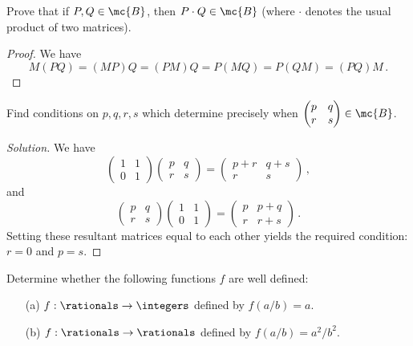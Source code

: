 \begin{exercise}
	Prove that if $P, Q \in \mc{B}$, then $P \cdot Q \in \mc{B}$ (where $\cdot$ denotes the usual product of two matrices).
\end{exercise}

\begin{proof}
	We have
	\[
		M(PQ) = (MP)Q = (PM)Q = P(MQ) = P(QM) = (PQ)M\,.
	\]
\end{proof}


\begin{exercise}
	Find conditions on $p, q, r, s$ which determine precisely when
	$\begin{pmatrix}
		p & q \\
		r & s
	\end{pmatrix}
	\in \mc{B}$.
\end{exercise}

\begin{proof}[Solution]
	We have
	\[
		\begin{pmatrix}
			1 & 1 \\
			0 & 1
		\end{pmatrix}
		\begin{pmatrix}
			p & q \\
			r & s
		\end{pmatrix}
		=
		\begin{pmatrix}
			p + r & q + s \\
			r & s
		\end{pmatrix}\,,
	\]
	and
	\[
		\begin{pmatrix}
			p & q \\
			r & s
		\end{pmatrix}
		\begin{pmatrix}
			1 & 1 \\
			0 & 1
		\end{pmatrix}
		=
		\begin{pmatrix}
			p & p + q \\
			r & r + s
		\end{pmatrix}\,.
	\]
	Setting these resultant matrices equal to each other yields the required condition: $r = 0$ and $p = s$.
\end{proof}


\begin{exercise}
	Determine whether the following functions $f$ are well defined:
	\begin{enumerate}
		\item[(a)] $f : \rationals \to \integers$ defined by $f(a/b)
			= a$.
		\item[(b)] $f : \rationals \to \rationals$ defined by
			$f(a/b) = a^2/b^2$.
	\end{enumerate}
\end{exercise}

